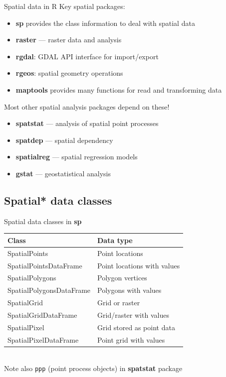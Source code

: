 \documentclass[aspectratio=169]{beamer}\usepackage[]{graphicx}\usepackage[]{color}
\begin{document}
\begin{frame}{Spatial data in R}
Key spatial packages:
\begin{itemize}
	\item \textbf{sp} provides the class information to deal with spatial data
	\item \textbf{raster} --- raster data and analysis
	\item \textbf{rgdal}: GDAL API interface for import/export
	\item \textbf{rgeos}: spatial geometry operations
	\item \textbf{maptools} provides many functions for read and transforming data
\end{itemize}
Most other spatial analysis packages depend on these!
\begin{itemize}
	\item \textbf{spatstat} --- analysis of spatial point processes
	\item \textbf{spatdep} --- spatial dependency
	\item \textbf{spatialreg} --- spatial regression models
	\item \textbf{gstat} --- geostatistical analysis
\end{itemize}
\end{frame}

\subsection{Spatial* data classes}
\begin{frame}{Spatial data classes in \textbf{sp}}
\begin{tabular}{|l|l|}
	\hline
	Class & Data type \\
	\hline
	SpatialPoints & Point locations \\
	SpatialPointsDataFrame & Point locations with values\\
	SpatialPolygons & Polygon vertices \\
	SpatialPolygonsDataFrame & Polygons with values\\
	SpatialGrid & Grid or raster \\
	SpatialGridDataFrame & Grid/raster with values\\
	SpatialPixel & Grid stored as point data  \\
	SpatialPixelDataFrame & Point grid with values\\
	\hline
\end{tabular}
\\Note also \texttt{ppp} (point process objects) in \textbf{spatstat} package
\end{frame}
\end{document}
